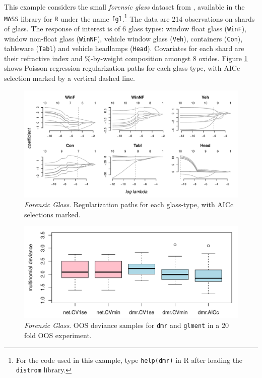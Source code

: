 \documentclass[12pt]{article}
\newcommand{\cd}[1]{{\tt#1}}
\begin{document}
This example considers the small {\it forensic glass} dataset from
\citet{venables_modern_2002}, available in the \cd{MASS} library for \cd{R}
under the name \cd{fgl}.\footnote{For the code used in this example, type
\cd{help(dmr)} in R after loading the \cd{distrom} library.}  The data are 214
observations on shards of glass. The response of interest is of 6 glass types:
window float glass (\cd{WinF}), window non-float glass (\cd{WinNF}), vehicle
window glass (\cd{Veh}), containers (\cd{Con}), tableware (\cd{Tabl}) and
vehicle headlamps (\cd{Head}).  Covariates for each shard are their refractive
index and \%-by-weight composition amongst 8 oxides. Figure \ref{fgl_coef}
shows Poisson regression regularization paths for each glass type,
with AICc selection marked by a vertical dashed line.


\begin{figure}[hb]
\includegraphics[width=6.25in]{../graphs/fgl_coef}
\caption{\label{fgl_coef} {\it Forensic Glass}. Regularization paths for each glass-type, with AICc selections marked.}
\end{figure}


\begin{figure}
\includegraphics[width=6.25in]{../graphs/fgl_cv}
\caption{\label{fgl_cv}  {\it Forensic Glass}. OOS deviance samples for \cd{dmr} and \cd{glment} in a 20 fold OOS experiment.  }\end{figure}
\end{document}
